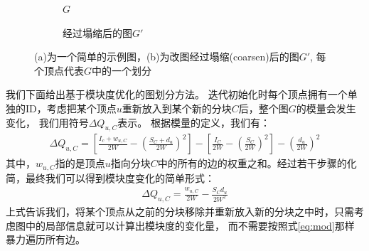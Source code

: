 \documentclass[master]{njuthesis}
\begin{document}
\begin{figure}[t]
    \centering
    \begin{subfigure}[b]{0.48\linewidth}        %
        \centering
        \label{fig:two:one}
	\resizebox{!}{!}{}
	\caption{$G$}
	\label{fig:figure2:figure1} 
	\end{subfigure}
    \begin{subfigure}[b]{0.48\linewidth}        %
     \centering
	\resizebox{!}{!}{}
	\caption{经过塌缩后的图$G\prime$}
	\label{fig:figure2:figure2}
    \end{subfigure}
    \caption{(a)为一个简单的示例图，(b)为改图经过塌缩(coarsen)后的图$G\prime$, 每个顶点代表$G$中的一个划分}
    \label{fig:two}
\end{figure}
我们下面给出基于模块度优化的图划分方法。
迭代初始化时每个顶点拥有一个单独的ID，考虑把某个顶点$u$重新放入到某个新的分块$C$后，整个图$G$的模量会发生变化，
我们用符号$\Delta Q_{u,C}$表示。
根据模量的定义，我们有：
\begin{equation}
\begin{aligned}
 \Delta Q_{u,C}=\left[ \frac{I_c+w_{u,C}}{2W} - {\left(\frac{S_C + d_u}{2W} \right)}^2 \right] -
 \left[ \frac{I_C}{2W} - {\left(\frac{S_C}{2W} \right)}^2 \right] - {\left(\frac{d_u}{2W}\right)}^2 
\end{aligned}
\end{equation}
其中，$w_{u,C}$指的是顶点$u$指向分块$C$中的所有的边的权重之和。经过若干步骤的化简，最终我们可以得到模块度变化的简单形式：
\begin{equation}
\begin{aligned}
\label{eq:deltaQ}
 \Delta Q_{u,C}=\frac{w_{u,C}}{2W} - \frac{S_Cd_u}{2W^2} 
\end{aligned}
\end{equation}
上式告诉我们，将某个顶点从之前的分块移除并重新放入新的分块之中时，只需考虑图中的局部信息就可以计算出模块度的变化量，
而不需要按照式\ref{eq:mod}那样暴力遍历所有边。
\end{document}
